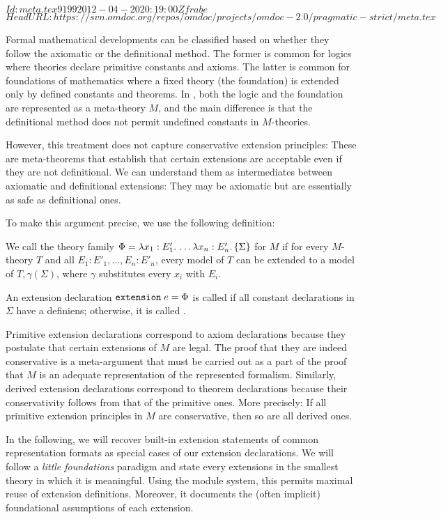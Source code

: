 \svnInfo $Id: meta.tex 9199 2012-04-20 20:19:00Z frabe $
\svnKeyword $HeadURL: https://svn.omdoc.org/repos/omdoc/projects/omdoc-2.0/pragmatic-strict/meta.tex $

Formal mathematical developments can be classified based on whether they follow the
axiomatic or the definitional method. The former is common for logics where theories
declare primitive constants and axioms. The latter is common for foundations of
mathematics where a fixed theory (the foundation) is extended only by defined constants
and theorems.  In {\mmt}, both the logic and the foundation are represented as a
meta-theory $M$, and the main difference is that the definitional method does not permit
undefined constants in $M$-theories.

However, this treatment does not capture conservative extension principles:
These are meta-theorems that establish that certain extensions are acceptable even if they are not definitional.
We can understand them as intermediates between axiomatic and definitional extensions: They may be axiomatic but are essentially as safe as definitional ones. 

To make this argument precise, we use the following definition:

\begin{definition}
We call the theory family
$\Phi=\lambda x_1:E'_1.\,\ldots\lambda x_n:E'_n.\,\{\Sigma\}$
 for $M$ if for every $M$-theory $T$ and all $E_1:E'_1,\ldots,E_n:E'_n$, every model of $T$ can be extended to a model of $T,\gamma(\Sigma)$, where $\gamma$ substitutes every $x_i$ with $E_i$.

  An extension declaration $\mathtt{extension}\;e = \Phi$ is called  if all
  constant declarations in $\Sigma$ have a definiens; otherwise, it is called .
\end{definition}

Primitive extension declarations correspond to axiom declarations because they postulate that certain extensions of $M$ are legal. The proof that they are indeed conservative is a meta-argument that must be carried out as a part of the proof that $M$ is an adequate {\mmt} representation of the represented formalism.
Similarly, derived extension declarations correspond to theorem declarations because their conservativity follows from that of the primitive ones. More precisely:
If all primitive extension principles in $M$ are conservative, then so are all derived ones.

In the following, we will recover built-in extension statements of common representation formats as special cases of our extension declarations.
We will follow a \emph{little foundations} paradigm and state every extensions in the smallest theory in which it is meaningful. Using the {\mmt} module system, this permits maximal reuse of extension definitions. Moreover, it documents the (often implicit) foundational assumptions of each extension.

